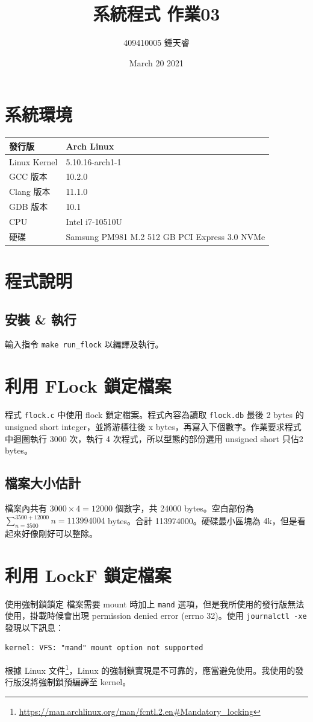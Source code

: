 \documentclass{ctexart}
\begin{document}
\pagestyle{headings}
\title{系統程式 作業03}
\author{409410005 鍾天睿}
\date{March 20 2021}
\maketitle
\clearpage

\section{系統環境}
\begin{center}
\begin{tabular}{ l l } 
\hline
發行版 & Arch Linux  \\
\hline
Linux Kernel & 5.10.16-arch1-1  \\
\hline
GCC 版本 & 10.2.0 \\
\hline
Clang 版本 & 11.1.0 \\
\hline
GDB 版本 & 10.1 \\
\hline
CPU & Intel i7-10510U \\
\hline
硬碟 & Samsung PM981 M.2 512 GB PCI Express 3.0 NVMe \\
\hline
\end{tabular}
\end{center}

\section{程式說明}
\subsection{安裝 \& 執行}
輸入指令 \texttt{make run_flock} 以編譯及執行。
\section{利用 FLock 鎖定檔案}
程式 \texttt{flock.c} 中使用 flock 鎖定檔案。程式內容為讀取 \texttt{flock.db} 最後 2 bytes 的 unsigned short integer，並將游標往後 x bytes，再寫入下個數字。作業要求程式中迴圈執行 3000 次，執行 4 次程式，所以型態的部份選用 unsigned short 只佔2 bytes。
\subsection{檔案大小估計}
檔案內共有 $3000\times4=12000$ 個數字，共 24000 bytes。空白部份為 
$\sum _{n=3500}^{3500+12000}n = 113994004$ bytes。合計 113974000。硬碟最小區塊為 4k，但是看起來好像剛好可以整除。

\section{利用 LockF 鎖定檔案}
使用強制鎖鎖定
檔案需要 mount 時加上 \texttt{mand} 選項，但是我所使用的發行版無法使用，掛載時候會出現 permission denied error (errno 32)。使用 \texttt{journalctl -xe} 發現以下訊息：
\begin{verbatim}
kernel: VFS: "mand" mount option not supported
\end{verbatim}
根據 Linux 文件\footnote{\url{https://man.archlinux.org/man/fcntl.2.en#Mandatory_locking}}，Linux 的強制鎖實現是不可靠的，應當避免使用。我使用的發行版沒將強制鎖預編譯至 kernel。
\clearpage
\end{document}
